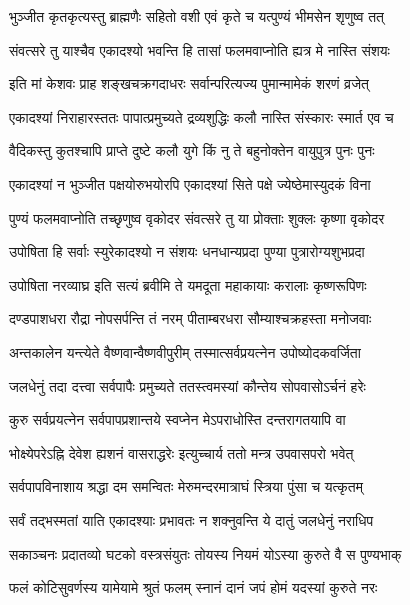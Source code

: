 \twolineshloka
{भुञ्जीत कृतकृत्यस्तु ब्राह्मणैः सहितो वशी}
{एवं कृते च यत्पुण्यं भीमसेन शृणुष्व तत्}%

\twolineshloka
{संवत्सरे तु याश्चैव एकादश्यो भवन्ति हि}
{तासां फलमवाप्नोति ह्यत्र मे नास्ति संशयः}%

\twolineshloka
{इति मां केशवः प्राह शङ्खचक्रगदाधरः}
{सर्वान्परित्यज्य पुमान्मामेकं शरणं व्रजेत्}%

\twolineshloka
{एकादश्यां निराहारस्ततः पापात्प्रमुच्यते}
{द्रव्यशुद्धिः कलौ नास्ति संस्कारः स्मार्त एव च}%

\twolineshloka
{वैदिकस्तु कुतश्चापि प्राप्ते दुष्टे कलौ युगे}
{किं नु ते बहुनोक्तेन वायुपुत्र पुनः पुनः}%

\twolineshloka
{एकादश्यां न भुञ्जीत पक्षयोरुभयोरपि}
{एकादश्यां सिते पक्षे ज्येष्ठेमास्युदकं विना}%

\twolineshloka
{पुण्यं फलमवाप्नोति तच्छृणुष्व वृकोदर}
{संवत्सरे तु या प्रोक्ताः शुक्लः कृष्णा वृकोदर}%

\twolineshloka
{उपोषिता हि सर्वाः स्युरेकादश्यो न संशयः}
{धनधान्यप्रदा पुण्या पुत्रारोग्यशुभप्रदा}%

\twolineshloka
{उपोषिता नरव्याघ्र इति सत्यं ब्रवीमि ते}
{यमदूता महाकायाः करालाः कृष्णरूपिणः}%

\twolineshloka
{दण्डपाशधरा रौद्रा नोपसर्पन्ति तं नरम्}
{पीताम्बरधरा सौम्याश्चक्रहस्ता मनोजवाः}%

\twolineshloka
{अन्तकालेन यन्त्येते वैष्णवान्वैष्णवीपुरीम्}
{तस्मात्सर्वप्रयत्नेन उपोष्योदकवर्जिता}%

\twolineshloka
{जलधेनुं तदा दत्त्वा सर्वपापैः प्रमुच्यते}
{ततस्त्वमस्यां कौन्तेय सोपवासोऽर्चनं हरेः}%

\twolineshloka
{कुरु सर्वप्रयत्नेन सर्वपापप्रशान्तये}
{स्वप्नेन मेऽपराधोस्ति दन्तरागतयापि वा}%

\twolineshloka
{भोक्ष्येपरेऽह्नि देवेश ह्यशनं वासराद्धरेः}
{इत्युच्चार्य ततो मन्त्र उपवासपरो भवेत्}%

\twolineshloka
{सर्वपापविनाशाय श्रद्धा दम समन्वितः}
{मेरुमन्दरमात्राघं स्त्रिया पुंसा च यत्कृतम्}%

\twolineshloka
{सर्वं तद्भस्मतां याति एकादश्याः प्रभावतः}
{न शक्नुवन्ति ये दातुं जलधेनुं नराधिप}%

\twolineshloka
{सकाञ्चनः प्रदातव्यो घटको वस्त्रसंयुतः}
{तोयस्य नियमं योऽस्या कुरुते वै स पुण्यभाक्}%

\twolineshloka
{फलं कोटिसुवर्णस्य यामेयामे श्रुतं फलम्}
{स्नानं दानं जपं होमं यदस्यां कुरुते नरः}%

